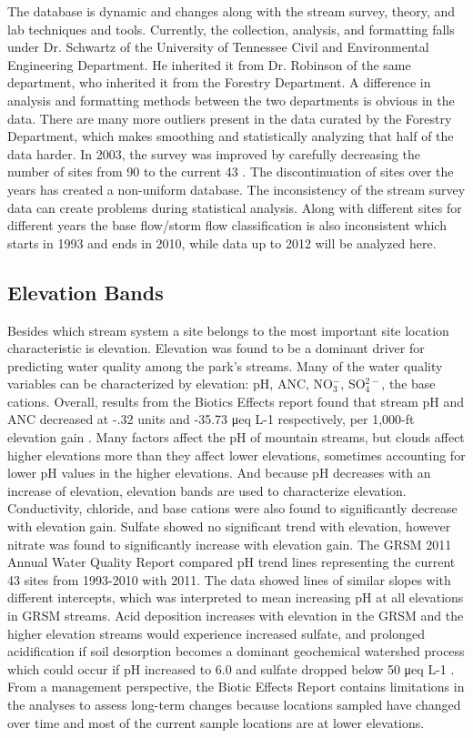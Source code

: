 The database is dynamic and changes along with the stream survey, theory,  and lab techniques and tools.
Currently, the collection, analysis, and formatting falls under Dr. Schwartz of the University of Tennessee Civil and Environmental Engineering Department.
He inherited it from Dr. Robinson of the same department, who inherited it from the Forestry Department.
A difference in analysis and formatting methods between the two departments is obvious in the data.
There are many more outliers present in the data curated by the Forestry Department, which makes smoothing and statistically analyzing that half of the data harder.
In 2003, the survey was improved by carefully decreasing the number of  sites from 90 to the current 43 \citep{odom2003}.
The discontinuation of sites over the years has created a non-uniform database.
The inconsistency of the stream survey data can create problems during statistical analysis.
Along with different sites for different years the base flow/storm flow classification is also inconsistent which starts in 1993 and ends in 2010, while data up to 2012 will be analyzed here.

\subsection{Elevation Bands}

Besides which stream system a site belongs to the most important site location characteristic is elevation.
Elevation was found to be a dominant driver for predicting water quality among the park's streams. 
Many of the water quality variables can be characterized by elevation: pH, ANC, NO$_3^-$, SO$_4^{2-}$, the base cations.
Overall, results from the Biotics Effects report found that stream pH and ANC decreased at -.32 units and -35.73 μeq L-1 respectively, per 1,000-ft elevation gain \citep{cai2013}. 
Many factors affect the pH of mountain streams, but clouds affect higher elevations more than they affect lower elevations, sometimes accounting for lower pH values in the higher elevations.
And because pH decreases with an increase of elevation, elevation bands are used to characterize elevation.
Conductivity, chloride, and base cations were also found to significantly decrease with elevation gain.  
Sulfate showed no significant trend with elevation, however nitrate was found to significantly increase with elevation gain.  
The GRSM 2011 Annual Water Quality Report compared pH trend lines representing the current 43 sites from 1993-2010 with 2011.  
The data showed lines of similar slopes with different intercepts, which was interpreted to mean increasing pH at all elevations in GRSM streams.  
Acid deposition increases with elevation in the GRSM and the higher elevation streams would experience increased sulfate, and prolonged acidification if soil desorption becomes a dominant geochemical watershed process which could occur if pH increased to 6.0 and sulfate dropped below 50 μeq L-1 \citep{annualreport2012}.  
From a management perspective, the Biotic Effects Report contains limitations in the analyses to assess long-term changes because locations sampled have changed over time and most of the current sample locations are at lower elevations.

